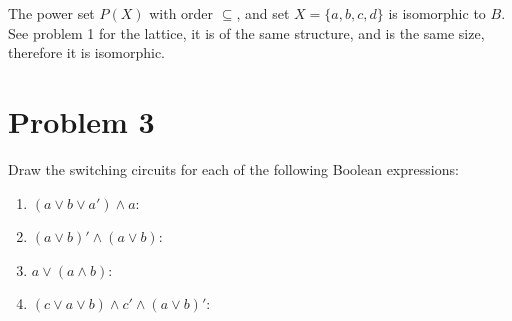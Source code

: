 \documentclass[12pt]{article}
\begin{document}
The power set $P(X)$ with order $\subseteq$, and set $X=\{a,b,c,d\}$ is isomorphic to $B$. See problem 1 for the lattice, it is of the same structure, and is the same size, therefore it is isomorphic.
\section{Problem 3}
Draw the switching circuits for each of the following Boolean expressions:
\begin{enumerate}
    \item $(a\vee b\vee a')\wedge a$:\newline{}
    \item $(a\vee b)'\wedge(a\vee b)$:\newline{}
    \item $a\vee(a\wedge b)$:\newline{}
    \item $(c\vee a\vee b)\wedge c'\wedge(a\vee b)'$:\newline{}
\end{enumerate}
\end{document}
